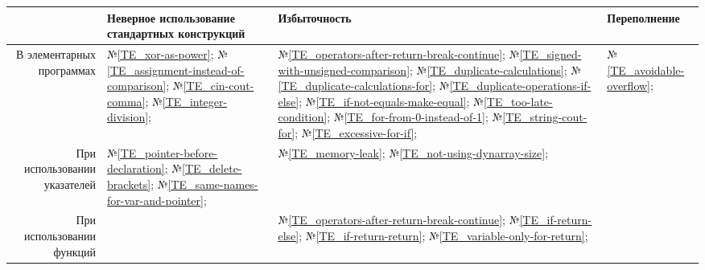\begin{center}
	\begin{tabular}{|r|m{4.5cm}|m{4cm}|m{4cm}|}\hline
		 & Неверное использование стандартных конструкций & Избыточность & Переполнение
		\\\hline
			В элементарных программах
		&
			№\ref{TE_xor-as-power};
			№\ref{TE_assignment-instead-of-comparison};
			№\ref{TE_cin-cout-comma};
			№\ref{TE_integer-division};
		&
			№\ref{TE_operators-after-return-break-continue}; %
			№\ref{TE_signed-with-unsigned-comparison};
			№\ref{TE_duplicate-calculations};
			№\ref{TE_duplicate-calculations-for};
			№\ref{TE_duplicate-operations-if-else};
			№\ref{TE_if-not-equals-make-equal};
			№\ref{TE_too-late-condition};
			№\ref{TE_for-from-0-instead-of-1};
			№\ref{TE_string-cout-for};
			№\ref{TE_excessive-for-if};
		&
			№\ref{TE_avoidable-overflow};
		\\\hline
			При использовании указателей
		&
			№\ref{TE_pointer-before-declaration};
			№\ref{TE_delete-brackets};
			№\ref{TE_same-names-for-var-and-pointer};
		&
			№\ref{TE_memory-leak};
			№\ref{TE_not-using-dynarray-size};
		&
		\\\hline
		При использовании функций
		&
		&
			№\ref{TE_operators-after-return-break-continue}; %
			№\ref{TE_if-return-else};
			№\ref{TE_if-return-return};
			№\ref{TE_variable-only-for-return};
		&
		\\\hline
	\end{tabular}
\end{center}
